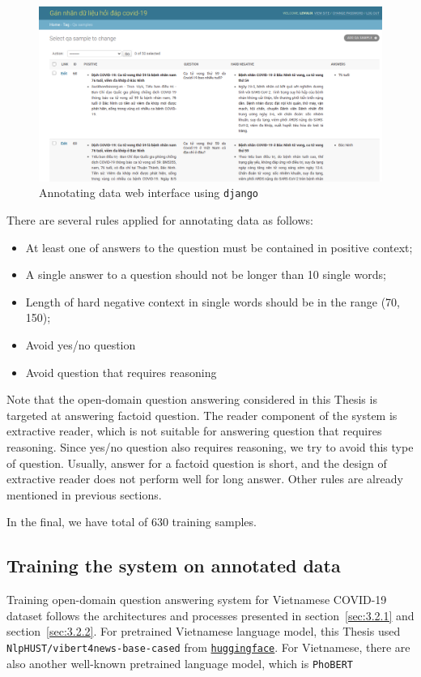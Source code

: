 \documentclass[12pt, sort&compress]{report}
\begin{document}
\begin{figure}[!htbp]
	\centering
	\includegraphics[scale=.3]{images/annotate.png}
	\caption{Annotating data web interface using {\tt django}}
	\label{fig:10}
\end{figure}
There are several rules applied for annotating data as follows:
\begin{itemize}
	\item At least one of answers to the question must be contained in positive context;
	\item A single answer to a question should not be longer than 10 single words;
	\item Length of hard negative context in single words should be in the range (70, 150);
	\item Avoid yes/no question
	\item Avoid question that requires reasoning
\end{itemize}
Note that the open-domain question answering considered in this Thesis is targeted at answering factoid question. The reader component of the system is extractive reader, which is not suitable for answering question that requires reasoning. Since yes/no question also requires reasoning, we try to avoid this type of question. Usually, answer for a factoid question is short, and the design of extractive reader does not perform well for long answer. Other rules are already mentioned in previous sections.
\par In the final, we have total of 630 training samples. 
\subsection{Training the system on annotated data}
\label{sec:3.3.3}
Training open-domain question answering system for Vietnamese COVID-19 dataset follows the architectures and processes presented in section~\ref{sec:3.2.1} and section~\ref{sec:3.2.2}. For pretrained Vietnamese language model, this Thesis used {\tt NlpHUST/vibert4news-base-cased} from \href{https://huggingface.co/}{\tt huggingface}. For Vietnamese, there are also another well-known pretrained language model, which is {\tt PhoBERT} \cite{nguyen2020phobert}
\end{document}
